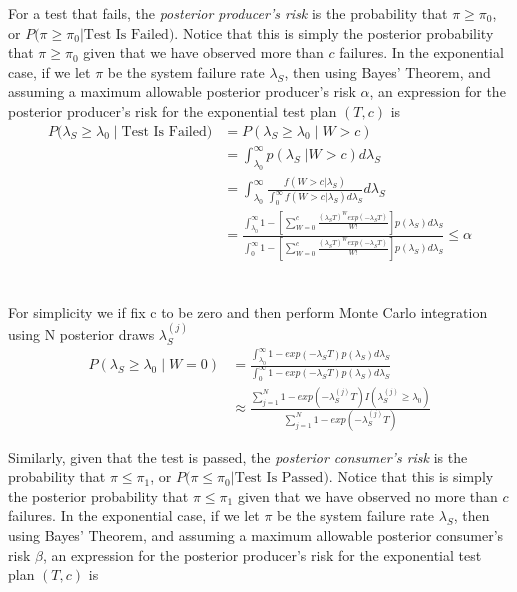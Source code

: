 \documentclass[12pt]{article}
\begin{document}
For a test that fails, the \emph{posterior producer's risk} is the probability
that $\pi \geq \pi_{0}$, or $P \text{(}\pi \ge \pi_0 \vert \text{Test Is
Failed)}$. Notice that this is simply the posterior probability that $\pi \ge
\pi_0$ given that we have observed more than $c$ failures. In the exponential
case, if we let $\pi$ be the system failure rate $\lambda_S$, then using Bayes'
Theorem, and assuming a maximum allowable posterior producer's risk $\alpha$, an
expression for the posterior producer's risk for the exponential test plan
$(T,c)$ is
$$
\begin{aligned}
    P(\lambda_S \geq \lambda_0 \; \vert \; \text{Test Is Failed)} &= P(\lambda_S
    \geq \lambda_0 \; \vert \; W > c) \\ &= \int_{\lambda_0}^{\infty}
    p(\lambda_S \; \vert W > c) d\lambda_S \\ &= \int_{\lambda_0}^{\infty}
    \frac{f(W > c \vert \lambda_S)}{\int_{0}^{\infty} f(W > c \vert \lambda_S)
    d\lambda_S} d\lambda_S \\ &= \frac{\int_{\lambda_0}^{\infty} 1 - [ \sum_{W=0}^c
    \frac{(\lambda_S T)^W exp(-\lambda_S T)}{W!}]p(\lambda_S)d\lambda_S}
    {\int_{0}^{\infty} 1 - [ \sum_{W=0}^c \frac{(\lambda_S T)^W exp(-\lambda_S
    T)}{W!}]p(\lambda_S)d\lambda_S} \leq \alpha
\end{aligned}
$$
\\
\\
For simplicity we if fix c to be zero and then perform Monte Carlo integration
using N posterior draws $ \lambda_S^{(j)} $
$$
\begin{aligned}
	 P(\lambda_S \geq \lambda_0 \; \vert \; W = 0) &=
	 \frac{\int_{\lambda_0}^{\infty} 1 - exp(-\lambda_S T)p(\lambda_S)d\lambda_S}
	 {\int_{0}^{\infty} 1 - exp(-\lambda_S T)p(\lambda_S)d\lambda_S} \\ &\approx
	 \frac{\sum_{j = 1}^{N} 1 - exp(-\lambda_S^{(j)} T)I(\lambda_S^{(j)} \geq
	 \lambda_0)} {\sum_{j = 1}^{N} 1 - exp(-\lambda_S^{(j)} T)} \end{aligned}
$$

Similarly, given that the test is passed, the \emph{posterior consumer's risk}
is the probability that $\pi \leq \pi_1$, or $P \text{(}\pi \leq \pi_0 \vert
\text{Test Is Passed)}$. Notice that this is simply the posterior probability
that $\pi \leq \pi_1$ given that we have observed no more than $c$ failures. In
the exponential case, if we let $\pi$ be the system failure rate $\lambda_S$,
then using Bayes' Theorem, and assuming a maximum allowable posterior consumer's
risk $\beta$, an expression for the posterior producer's risk for the
exponential test plan $(T,c)$ is
\end{document}
